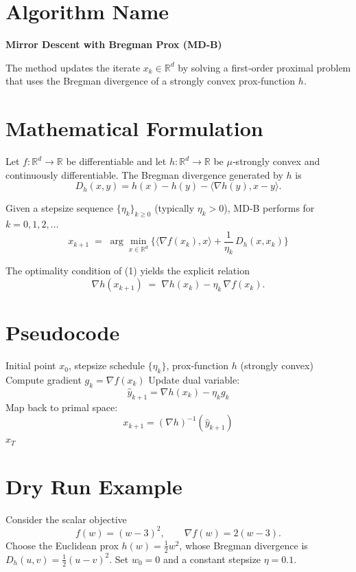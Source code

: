 \documentclass{article}
\newcommand{\inner}[2]{\langle #1,#2\rangle}
\newcommand{\D}[2]{D_{h}(#1,#2)}
\begin{document}
\section*{Algorithm Name}
\textbf{Mirror Descent with Bregman Prox (MD‑B)}  

The method updates the iterate $x_k\in\mathbb{R}^d$ by solving a
first‑order proximal problem that uses the Bregman divergence of a
strongly convex prox‑function $h$.

\section*{Mathematical Formulation}
Let $f:\mathbb{R}^d\rightarrow\mathbb{R}$ be differentiable and let  
$h:\mathbb{R}^d\rightarrow\mathbb{R}$ be $\mu$‑strongly convex and
continuously differentiable.  
The Bregman divergence generated by $h$ is  
\[
\D{x}{y}=h(x)-h(y)-\inner{\nabla h(y)}{x-y}.
\]

Given a stepsize sequence $\{\eta_k\}_{k\ge 0}$ (typically
$\eta_k>0$), MD‑B performs for $k=0,1,2,\dots$
\[
\boxed{
x_{k+1}\;=\;\arg\min_{x\in\mathbb{R}^d}
\Big\{ \inner{\nabla f(x_k)}{x}+ \frac{1}{\eta_k}\,\D{x}{x_k}\Big\}
}
\tag{1}
\]

The optimality condition of (1) yields the explicit relation
\[
\nabla h(x_{k+1}) \;=\; \nabla h(x_k)-\eta_k\,\nabla f(x_k).
\tag{2}
\]

\section*{Pseudocode}
\begin{algorithm}[H]
\caption{Mirror Descent with Bregman Prox (MD‑B)}
\begin{algorithmic}[1]
\REQUIRE Initial point $x_0$, stepsize schedule $\{\eta_k\}$,
prox‑function $h$ (strongly convex)
    \STATE Compute gradient $g_k=\nabla f(x_k)$
    \STATE Update dual variable:
    \[
    \hat{y}_{k+1}= \nabla h(x_k)-\eta_k g_k
    \]
    \STATE Map back to primal space:
    \[
    x_{k+1}= (\nabla h)^{-1}(\hat{y}_{k+1})
    \]
\ENDFOR
\RETURN $x_T$
\end{algorithmic}
\end{algorithm}

\section*{Dry Run Example}
Consider the scalar objective
\[
f(w)=(w-3)^2,\qquad \nabla f(w)=2(w-3).
\]
Choose the Euclidean prox $h(w)=\tfrac12 w^{2}$, whose Bregman
divergence is $D_h(u,v)=\tfrac12 (u-v)^2$.
Set $w_0=0$ and a constant stepsize $\eta=0.1$.
\end{document}
